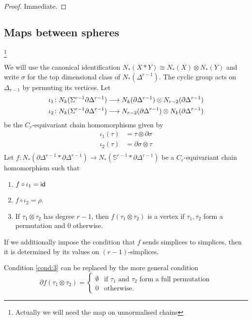 \begin{proof}
	Immediate.
\end{proof}

\subsection{Maps between spheres}\footnote{Actually we will need the map on unnormalised chains}

We will use the canonical identification $N_*(X*Y) \cong N_*(X)\otimes N_*(Y)$ and write $\sigma$ for the top dimensional class of $N_*(\Delta^{r-1})$. The cyclic group acts on $\Delta_{r-1}$ by permuting its vertices.
Let
\begin{align*}
	\iota_1\colon N_k(\Sigma^{r-1}\partial \Delta^{r-1})&\longrightarrow N_{k}(\partial\Delta^{r-1})\otimes N_{r-2}(\partial\Delta^{r-1})\\
	\iota_2\colon N_k(\Sigma^{r-1}\partial \Delta^{r-1})&\longrightarrow N_{r-2}(\partial\Delta^{r-1})\otimes N_{k}(\partial\Delta^{r-1})
\end{align*}
be the $C_r$-equivariant chain homomorphisms given by
\begin{align*}
	\iota_1(\tau) &= \tau\otimes \partial \sigma \\
	\iota_2(\tau) &= \partial \sigma\otimes \tau \\
\end{align*}
Let $f\colon N_*(\partial\Delta^{r-1}*\partial\Delta^{r-1})\to N_*(\mathbb{S}^{r-1}*\partial\Delta^{r-1})$ be a $C_r$-equivariant chain homomorphism such that
\renewcommand{\theenumi}{\roman{enumi}}
\begin{enumerate}
	\item\label{cond:1} $f\circ \iota_1 = \mathsf{id}$
	\item\label{cond:2} $f\circ \iota_2 = \rho$.
	\item\label{cond:3} If $\tau_1\otimes\tau_2$ has degree $r-1$, then $f(\tau_1\otimes \tau_2)$ is a vertex if $\tau_1,\tau_2$ form a permutation and $0$ otherwise.
\end{enumerate}

\begin{remark}
	If we additionally impose the condition that $f$ sends simplices to simplices, then it is determined by its values on $(r-1)$-simplices.
\end{remark}

\begin{remark}
	Condition \eqref{cond:3} can be replaced by the more general condition
	\[
	\partial f(\tau_1\otimes\tau_2) =
	\begin{cases}
	\emptyset & \text{if $\tau_1$ and $\tau_2$ form a full permutation} \\
	0 & \text{otherwise}.
	\end{cases}
	\]
\end{remark}


